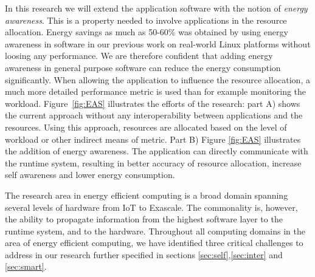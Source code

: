 \documentclass{article}
\begin{document}
In this research we will extend the application software with the notion of \textit{energy awareness}.
This is a property needed to involve applications in the resource allocation.
Energy savings as much as 50-60\% was obtained by using energy awareness in software in our previous work \cite{Holmbacka:15} on real-world Linux platforms without loosing any performance.
We are therefore confident that adding energy awareness in general purpose software can reduce the energy consumption significantly.
When allowing the application to influence the resource allocation, a much more detailed performance metric is used than for example monitoring the workload.
Figure~\ref{fig:EAS} illustrates the efforts of the research: part A) shows the current approach without any interoperability between applications and the resources.
Using this approach, resources are allocated based on the level of workload or other indirect means of metric.
Part B) Figure \ref{fig:EAS} illustrates the addition of energy awareness. The application can directly communicate with the runtime system, resulting in better accuracy of resource allocation, increase self awareness and lower energy consumption.\smallskip

The research area in energy efficient computing is a broad domain spanning several levels of hardware from IoT to Exascale.
The commonality is, however, the ability to propagate information from the highest software layer to the runtime system, and to the hardware.
Throughout all computing domains in the area of energy efficient computing, we have identified three critical challenges to address in our research further specified in sections \ref{sec:self},\ref{sec:inter} and \ref{sec:smart}.
\end{document}
